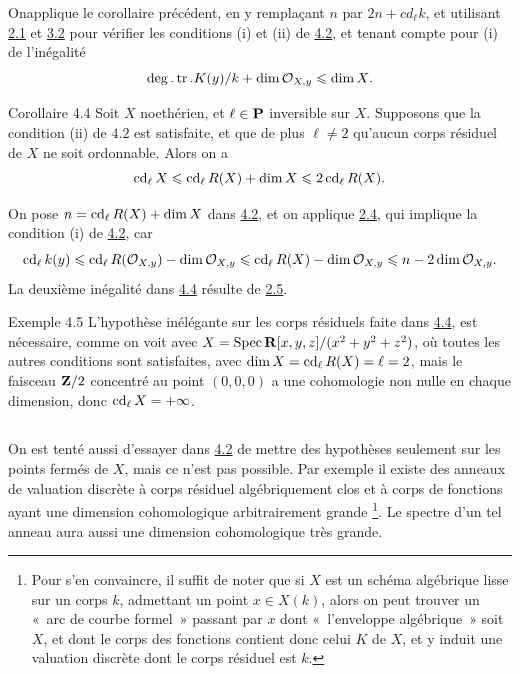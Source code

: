\documentclass[10pt]{../fichiers-configuration-latex/smfart}
\begin{document}
On\pageoriginale applique le corollaire précédent, en y remplaçant
$n$ par $2n+cd_{\ell}k$, et utilisant \hyperref[X.thm2.1]{2.1} et \hyperref[X.prop3.2]{3.2} 
pour vérifier les
conditions (i) et (ii) de \hyperref[X.cor4.2]{4.2}, et tenant compte pour (i) de
l'inégalité
$$
\deg.\operatorname{tr}.K(y)/k+\dim {\mathcal O}_{X,y}\leqslant \dim X{}.
$$

\begin{enonce*}{Corollaire 4.4}
Soit $X$ noethérien, et $\ell\in \mathbf{P}$ inversible
sur $X$. Supposons que la condition {\rm (ii)} de $4.2$ est
satisfaite, et que de plus $\ell\neq 2$  qu'aucun corps résiduel de
$X$ ne soit ordonnable. Alors on a
$$
\operatorname{cd}_{\ell}X\leqslant \operatorname{cd}_{\ell}R(X)+\dim X\leqslant 2\operatorname{cd}_{\ell}R(X){}.
$$
\end{enonce*}

On pose $n=\operatorname{cd}_{\ell}R(X)+\dim X$ dans \hyperref[X.cor4.2]{4.2}, et on applique \hyperref[X.cor2.4]{2.4}, 
qui implique la condition (i) de \hyperref[X.cor4.2]{4.2}, car
\[\operatorname{cd}_{\ell}k(y)\leqslant \operatorname{cd}_{\ell}R({\mathcal O}_{X,y})-\dim {\mathcal O}_{X,y}\leqslant
\operatorname{cd}_{\ell}R(X)-\dim{\mathcal O}_{X,y}\leqslant n-2\dim {\mathcal O}_{X,y}.
\]
La deuxième inégalité dans \hyperref[X.cor4.4]{4.4} résulte de \hyperref[X.cor2.5]{2.5}.

\begin{enonce*}[remark]{Exemple 4.5}
L'hypothèse inélégante sur les corps résiduels faite dans \hyperref[X.cor4.4]{4.4}, est
nécessaire, comme on voit avec $X=\operatorname{Spec}
\mathbf{R}[x,y,z]/(x^2+y^2+z^2)$, où toutes les autres
conditions sont satisfaites, avec $\dim X=\operatorname{cd}_{\ell}R(X)=\ell=2$, mais
le faisceau $\mathbf{Z}/2$ concentré au point $(0,0,0)$ a
une cohomologie non nulle en chaque dimension, donc
$\operatorname{cd}_{\ell}X=+\infty$.
\end{enonce*}

\setcounter{subsection}{5}
\subsection{}
On est tenté aussi d'essayer dans \hyperref[X.cor4.2]{4.2} de mettre des hypothèses
seulement sur les points fermés de $X$, mais ce n'est pas
possible. Par exemple il existe des anneaux de valuation discrète à
corps résiduel algébriquement clos et à corps de fonctions ayant une
dimension cohomologique arbitrairement grande \footnote[1]{Pour s'en
  convaincre, il suffit de noter que si $X$ est un schéma algébrique
  lisse sur un corps $k$, admettant un point $x\in X(k)$, alors on
  peut trouver un « arc de courbe formel » passant par $x$ dont
  « l'enveloppe algébrique » soit $X$, et dont le corps des
  fonctions contient donc celui $K$ de $X$, et y induit une valuation
  discrète dont le corps résiduel est $k$.}. Le spectre d'un tel
anneau aura aussi une dimension cohomologique très grande.
\end{document}
